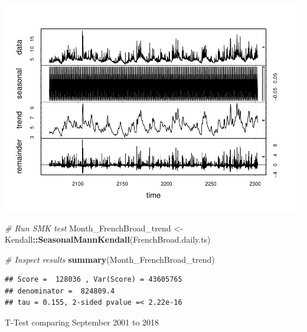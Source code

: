 \documentclass[12pt,]{article}
\newenvironment{Shaded}{\begin{snugshade}}{\end{snugshade}}
\newcommand{\CommentTok}[1]{\textcolor[rgb]{0.56,0.35,0.01}{\textit{#1}}}
\newcommand{\DecValTok}[1]{\textcolor[rgb]{0.00,0.00,0.81}{#1}}
\newcommand{\KeywordTok}[1]{\textcolor[rgb]{0.13,0.29,0.53}{\textbf{#1}}}
\newcommand{\NormalTok}[1]{#1}
\newcommand{\OperatorTok}[1]{\textcolor[rgb]{0.81,0.36,0.00}{\textbf{#1}}}
\newcommand{\StringTok}[1]{\textcolor[rgb]{0.31,0.60,0.02}{#1}}
\begin{document}
\includegraphics{Project_Template_files/figure-latex/TimeSeries-3.pdf}

\begin{Shaded}
\begin{Highlighting}[]
\CommentTok{# Run SMK test}
\NormalTok{Month_FrenchBroad_trend <-}\StringTok{ }\NormalTok{Kendall}\OperatorTok{::}\KeywordTok{SeasonalMannKendall}\NormalTok{(FrenchBroad.daily.ts)}

\CommentTok{# Inspect results}
\KeywordTok{summary}\NormalTok{(Month_FrenchBroad_trend)}
\end{Highlighting}
\end{Shaded}

\begin{verbatim}
## Score =  128036 , Var(Score) = 43605765
## denominator =  824809.4
## tau = 0.155, 2-sided pvalue =< 2.22e-16
\end{verbatim}

T-Test comparing September 2001 to 2018

\begin{Shaded}
\end{Shaded}
\end{document}
